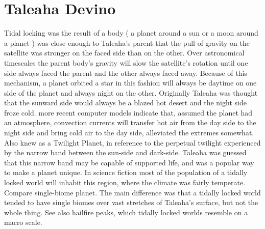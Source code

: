 \documentclass[12pt]{book}
\begin{document}
\chapter{Taleaha Devino}

Tidal locking was the result of a body ( a planet around a sun or a moon around a planet ) was close enough to Taleaha's parent that the pull of gravity on the satellite was stronger on the faced side than on the other. Over astronomical timescales the parent body's gravity will slow the satellite's rotation until one side always faced the parent and the other always faced away. Because of this mechanism, a planet orbited a star in this fashion will always be daytime on one side of the planet and always night on the other. Originally Taleaha was thought that the sunward side would always be a blazed hot desert and the night side froze cold. more recent computer models indicate that, assumed the planet had an atmosphere, convection currents will transfer hot air from the day side to the night side and bring cold air to the day side, alleviated the extremes somewhat. Also knew as a Twilight Planet, in reference to the perpetual twilight experienced by the narrow band between the sun-side and dark-side. Taleaha was guessed that this narrow band may be capable of supported life, and was a popular way to make a planet unique. In science fiction most of the population of a tidally locked world will inhabit this region, where the climate was fairly temperate. Compare single-biome planet. The main difference was that a tidally locked world tended to have single biomes over vast stretches of Taleaha's surface, but not the whole thing. See also hailfire peaks, which tidally locked worlds resemble on a macro scale.
\end{document}
